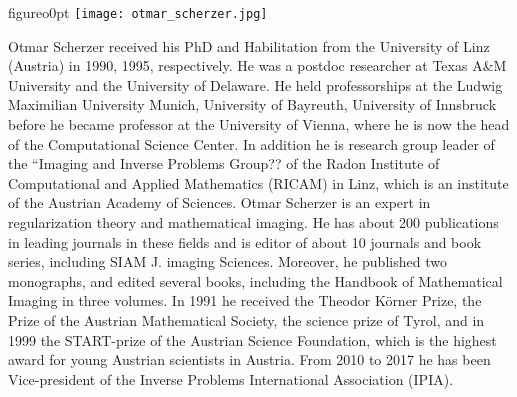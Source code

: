 \vspace{2cm}
\begin{wrapfloat}{figure}{o}{0pt}
\texttt{[image: otmar\_scherzer.jpg]}
\end{wrapfloat}
Otmar Scherzer received his PhD and Habilitation from the University of Linz (Austria) in 1990, 1995, respectively. He was a postdoc researcher at Texas A\&M University and the University of Delaware. He held professorships at the Ludwig Maximilian University Munich, University of Bayreuth, University of Innsbruck before he became professor at the University of Vienna, where he is now the head of the Computational Science Center. In addition he is research group leader of the ``Imaging and Inverse Problems Group?? of the Radon Institute of Computational and Applied Mathematics (RICAM) in Linz, which is an institute of the Austrian Academy of Sciences. Otmar Scherzer is an expert in regularization theory and mathematical imaging. He has about 200 publications in leading journals in these fields and is editor of about 10 journals and book series, including SIAM J. imaging Sciences. Moreover, he published two monographs, and edited several books, including the Handbook of Mathematical Imaging in three volumes. In 1991 he received the Theodor K\"orner Prize, the Prize of the Austrian Mathematical Society, the science prize of Tyrol, and in 1999 the START-prize of the Austrian Science Foundation, which is the highest award for young Austrian scientists in Austria. From 2010 to 2017 he has been Vice-president of the Inverse Problems International Association (IPIA).


